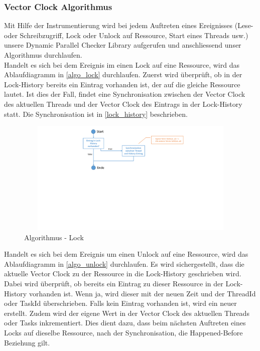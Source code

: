 \documentclass[10pt,a4paper]{article}
\begin{document}
\subsubsection{Vector Clock Algorithmus}\label{vector_algorithm}
\begin{flushleft}
Mit Hilfe der Instrumentierung wird bei jedem Auftreten eines Ereignisses (Lese- oder Schreibzugriff, Lock oder Unlock auf Ressource, Start eines Threads usw.) unsere Dynamic Parallel Checker Library aufgerufen und anschliessend unser Algorithmus durchlaufen.\\[0.3cm]
Handelt es sich bei dem Ereignis im einen Lock auf eine Ressource, wird das Ablaufdiagramm in \autoref{algo_lock} durchlaufen. Zuerst wird überprüft, ob in der Lock-History bereits ein Eintrag vorhanden ist, der auf die gleiche Ressource lautet. Ist dies der Fall, findet eine Synchronisation zwischen der Vector Clock des aktuellen Threads und der Vector Clock des Eintrags in der Lock-History statt. Die Synchronisation ist in \ref{lock_history} beschrieben.\\
\begin{figure}[H]
\centering
	\includegraphics[width=14cm,height=5.5cm,trim=70mm 110mm 70mm 5mm, clip]{images/Lock.pdf}
\caption{Algorithmus - Lock}\label{algo_lock}
\end{figure}
Handelt es sich bei dem Ereignis um einen Unlock auf eine Ressource, wird das Ablaufdiagramm in \autoref{algo_unlock} durchlaufen. Es wird sichergestellt, dass die aktuelle Vector Clock zu der Ressource in die Lock-History geschrieben wird. Dabei wird überprüft, ob bereits ein Eintrag zu dieser Ressource in der Lock-History vorhanden ist. Wenn ja, wird dieser mit der neuen Zeit und der ThreadId oder TaskId überschrieben. Falls kein Eintrag vorhanden ist, wird ein neuer erstellt. Zudem wird der eigene Wert in der Vector Clock des aktuellen Threads oder Tasks inkrementiert. Dies dient dazu, dass beim nächsten Auftreten eines Locks auf dieselbe Ressource, nach der Synchronisation, die Happened-Before Beziehung gilt. \\

\end{flushleft}
\end{document}
